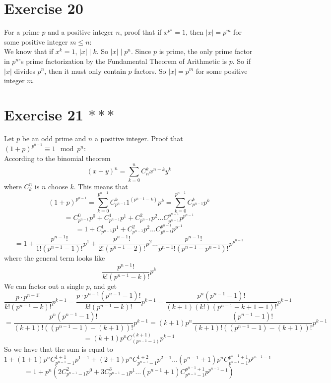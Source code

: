 \documentclass{article}
\begin{document}
    \section*{Exercise 20}
    For a prime $p$ and a positive integer $n$, proof that if $x^{p^n} = 1$,
    then $|x| = p^m$ for some positive integer $m \leqslant n$: \\
    We know that if $x^k = 1$, $|x| \mid k$.
    So $|x| \mid p^n$.
    Since $p$ is prime, the only prime factor in $p^n$'s
    prime factorization by the Fundamental Theorem of Arithmetic
    is $p$.
    So if $|x|$ divides $p^n$, then it must only contain $p$ factors.
    So $|x| = p^m$ for some positive integer $m$.


    \section*{Exercise 21 $***$}
    Let $p$ be an odd prime and $n$ a positive integer.
    Proof that $(1 + p)^{p^{n-1}} \equiv 1 \mod p^n$: \\ 
    According to the binomial theorem
    \[ (x + y)^n = \sum_{k = 0}^{n} C_{n}^{k}x^{n-k}y^k \]
    where $C_{k}^{n}$ is $n$ choose $k$. This means that 
    \[ (1 + p)^{p^{n-1}}
    = \sum_{k = 0}^{p^{n-1}} C_{p^{n-1}}^{k}1^{(p^{n-1} - k)}p^k
    = \sum_{k = 0}^{p^{n-1}} C_{p^{n-1}}^{k}p^k \]
    \[ = C_{p^{n-1}}^0p^0 + C_{p^{n-1}}^1p^1 + C_{p^{n-1}}^2p^{2}
    \dots C_{p^{n-1}}^{p^{n-1}}p^{p^{n-1}} \]
    \[ = 1 + C_{p^{n-1}}^1p^1 + C_{p^{n-1}}^2p^2
    \dots C_{p^{n-1}}^{p^{n-1}}p^{p^{-1}} \]
    \[ = 1 + \dfrac{p^{n-1}!}{1!(p^{n-1} - 1)!}p^1
    + \dfrac{p^{n-1}!}{2!(p^{n-1} - 2)!}p^2 \dots
    \dfrac{p^{n-1}!}{p^{n-1}!(p^{n-1} - p^{n-1})!}p^{p^{n-1}} \]
    where the general term looks like
    \[ \dfrac{p^{n-1}!}{k!(p^{n-1} - k)!}p^k \]
    We can factor out a single $p$, and get
    \[ \dfrac{p \cdot p^{n-1!}}{k!(p^{n-1} - k)!}p^{k-1}
    = \dfrac{p \cdot p^{n-1}(p^{n-1} - 1)!}{k!(p^{n-1} - k)!}p^{k-1}
    = \dfrac{p^n(p^{n-1} - 1)!}{(k+1)(k!)(p^{n-1} - k + 1 - 1)!}p^{k-1} \]
    \[ = \dfrac{p^n(p^{n-1} - 1)!}{(k + 1)!((p^{n-1} - 1)-(k + 1))!}p^{k-1}
    = (k+1)p^n \dfrac{(p^{n-1}-1)!}{(k + 1)!((p^{n-1}-1)-(k + 1))!}p^{k-1} \]
    \[ = (k+1)p^n C_{(p^{n-1} - 1)}^{(k+1)} p^{k-1} \]
    So we have that the sum is equal to
    \[ 1 + (1 + 1)p^nC_{p^{n-1} - 1}^{1 + 1}p^{1-1}
    + (2+1)p^nC_{p^{n-1} - 1}^{1 + 2}p^{2-1} \dots
    (p^{n-1}+1)p^nC_{p^{n-1} - 1}^{p^{n-1} + 1}p^{p^{n-1}-1} \]
    \[ = 1 + p^n(2C_{p^{n-1} - 1}^{2}p^{0}
    + 3C_{p^{n-1} - 1}^{3}p^{1} \dots
    (p^{n-1}+1)C_{p^{n-1} - 1}^{p^{n-1} + 1}p^{p^{n-1}-1}) \]
\end{document}
